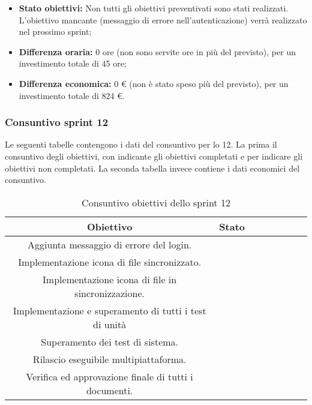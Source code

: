 \begin{itemize}
	\item \textbf{Stato obiettivi:} Non tutti gli obiettivi preventivati sono stati realizzati. L'obiettivo mancante (messaggio di errore nell'autenticazione) verrà realizzato nel prossimo sprint;
	\item \textbf{Differenza oraria:} 0 ore (non sono servite ore in più del previsto), per un investimento totale di 45 ore;
	\item \textbf{Differenza economica:} 0 \euro{} (non è stato speso più del previsto), per un investimento totale di 824 \euro{}.
\end{itemize}


\subsubsection{Consuntivo sprint 12}
Le seguenti tabelle contengono i dati del consuntivo per lo  12. La prima il consuntivo degli obiettivi, con \checkmark{} indicante gli obiettivi completati e \xmark{} per indicare gli obiettivi non completati. La seconda tabella invece contiene i dati economici del consuntivo.\newline{}

\begin{table}[H]
		\begin{center}
			\setlength{\aboverulesep}{0pt}
			\setlength{\belowrulesep}{0pt}
			\setlength{\extrarowheight}{.75ex}
			\begin{tabular}{ c c c c c c c c }
				\rowcolor{AzzurroGruppo!30} 
				\textbf{Obiettivo} & \textbf{Stato} \\
				\toprule
				Aggiunta messaggio di errore del login. & \checkmark{} \\
				Implementazione icona di file sincronizzato. & \checkmark{} \\
				Implementazione icona di file in sincronizzazione. & \checkmark{} \\
				Implementazione e superamento di tutti i test di unità & \checkmark{} \\
				Superamento dei test di sistema. & \checkmark{} \\ 
				Rilascio eseguibile multipiattaforma. & \checkmark{} \\
				Verifica ed approvazione finale di tutti i documenti. & \checkmark{} \\
				\bottomrule
			\end{tabular}
			\caption{Consuntivo obiettivi dello sprint 12}
		\end{center}
	\end{table}
	

